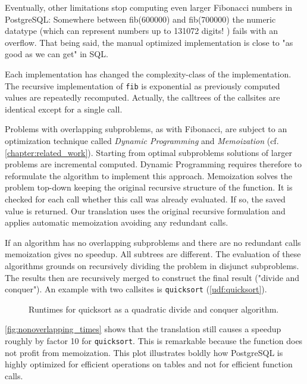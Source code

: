 Eventually, other limitations stop computing even larger Fibonacci numbers in PostgreSQL: Somewhere between fib(600000) and fib(700000) the numeric datatype (which can represent numbers up to 131072 digits! \cite[p. 124 f.]{psql}) fails with an overflow. That being said, the manual optimized implementation is close to "as good as we can get" in SQL.

Each implementation has changed the complexity-class of the implementation. The recursive implementation of \texttt{fib} is exponential as previously computed values are repeatedly recomputed. Actually, the calltrees of the callsites are identical except for a single call.

Problems with overlapping subproblems, as with Fibonacci, are subject to an optimization technique called \textit{Dynamic Programming} and \textit{Memoization} (cf. \autoref{chapter:related_work}). Starting from optimal subproblems solutions of larger problems are incremental computed. Dynamic Programming requires therefore to reformulate the algorithm to implement this approach. Memoization solves the problem top-down keeping the original recursive structure of the function. It is checked for each call whether this call was already evaluated. If so, the saved value is returned. Our translation uses the original recursive formulation and applies automatic memoization avoiding any redundant calls.

If an algorithm has no overlapping subproblems and there are no redundant calls memoization gives no speedup. All subtrees are different. The evaluation of these algorithms grounds on recursively dividing the problem in disjunct subproblems. The results then are recursively merged to construct the final result ("divide and conquer"). An example with two callsites is \texttt{quicksort} (\autoref{udf:quicksort}).

\begin{figure}[h!]
    \centering\small
    
    \caption{Runtimes for quicksort as a quadratic divide and conquer algorithm.}
    \label{fig:nonoverlapping_times}
\end{figure}

\autoref{fig:nonoverlapping_times} shows that the translation still causes a speedup roughly by factor 10 for \texttt{quicksort}. This is remarkable because the function does not profit from memoization. This plot illustrates boldly how PostgreSQL is highly optimized for efficient operations on tables and not for efficient function calls.


